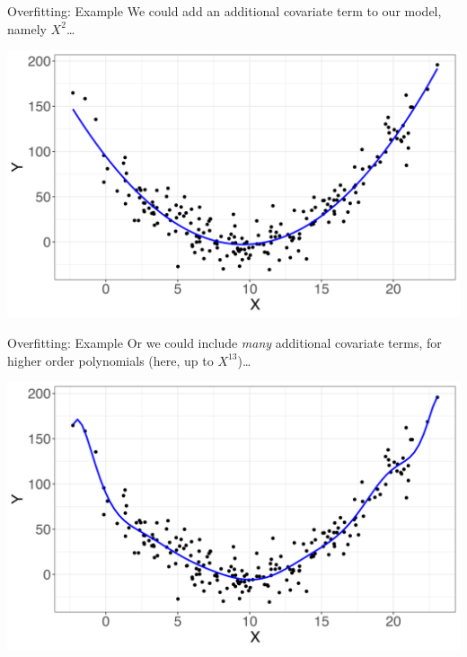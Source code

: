 \documentclass[10pt,t]{beamer}
\begin{document}
\begin{frame}{Overfitting: Example}
We could add an additional covariate term to our model, namely $X^2$\dots

\vspace{0.3cm}

\centering \includegraphics[scale=0.4]{figures/overfit3.png}

\end{frame}

\begin{frame}{Overfitting: Example}
Or we could include \textit{many} additional covariate terms, for higher order polynomials (here, up to $X^{13}$)\dots

\vspace{0.3cm}

\centering \includegraphics[scale=0.4]{figures/overfit4.png}

\end{frame}
\end{document}
